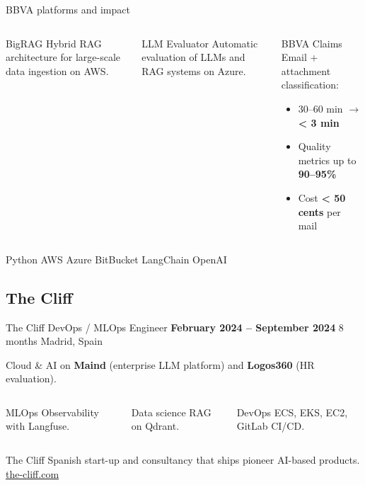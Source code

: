 \documentclass[10pt]{beamer}
\begin{document}
\begin{frame}{BBVA \textperiodcentered{} platforms and impact}
  \begin{columns}[T,onlytextwidth]
      \begin{block}{BigRAG}
        Hybrid RAG architecture for large-scale data ingestion on AWS.
      \end{block}
      \begin{exampleblock}{LLM Evaluator}
        Automatic evaluation of LLMs and RAG systems on Azure.
      \end{exampleblock}
      \begin{alertblock}{BBVA Claims}
        Email + attachment classification:
        \begin{itemize}
          \item 30--60 min $\rightarrow$ \textbf{< 3 min}
          \item Quality metrics up to \textbf{90--95\%}
          \item Cost \textbf{< 50 cents} per mail
        \end{itemize}
      \end{alertblock}
  \end{columns}

  \vspace{0.2em}
  {\small Python \textbullet{} AWS \textbullet{} Azure \textbullet{} BitBucket
  \textbullet{} LangChain \textbullet{} OpenAI}
\end{frame}

\subsection{The Cliff}

\begin{frame}{The Cliff \textperiodcentered{} DevOps / MLOps Engineer}
  \textbf{February 2024 -- September 2024} \hfill 8 months \textbullet{}
  Madrid, Spain

  Cloud \& AI on \textbf{Maind} (enterprise LLM platform) and
  \textbf{Logos360} (HR evaluation).

  \vspace{0.15em}
  \begin{columns}[T,onlytextwidth]
      \begin{block}{MLOps}
        Observability with Langfuse.
      \end{block}
      \begin{exampleblock}{Data science}
        RAG on Qdrant.
      \end{exampleblock}
      \begin{alertblock}{DevOps}
        ECS, EKS, EC2, GitLab CI/CD.
      \end{alertblock}
  \end{columns}

  \begin{exampleblock}{The Cliff}
    Spanish start-up and consultancy that ships pioneer AI-based products.
    \hfill \href{https://the-cliff.com/}{the-cliff.com}
  \end{exampleblock}
\end{frame}
\end{document}
